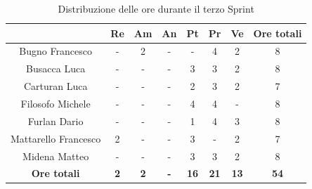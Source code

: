 \begin{table}[H]
  \centering
  \renewcommand{\arraystretch}{1.8}
  \begin{tabular}{c|c|c|c|c|c|c|c}
    \rowcolor[HTML]{125E28}
    \multicolumn{1}{c}{\color[HTML]{FFFFFF}\textbf{ Nominativo }}
                         & \multicolumn{1}{c}{\color[HTML]{FFFFFF}\textbf{ Re }}
                         & \multicolumn{1}{c}{\color[HTML]{FFFFFF}\textbf{ Am}}
                         & \multicolumn{1}{c}{\color[HTML]{FFFFFF}\textbf{ An }}
                         & \multicolumn{1}{c}{\color[HTML]{FFFFFF}\textbf{ Pt }}
                         & \multicolumn{1}{c}{\color[HTML]{FFFFFF}\textbf{ Pr }}
                         & \multicolumn{1}{c}{\color[HTML]{FFFFFF}\textbf{ Ve }}
                         & \multicolumn{1}{c}{\color[HTML]{FFFFFF}\textbf{ Ore totali }}                                                                                   \\
    \hline
    Bugno Francesco      & -                                                             & 2          & -          & -           & 4           & 2           & 8           \\
    Busacca Luca         & -                                                             & -          & -          & 3           & 3           & 2           & 8           \\
    Carturan Luca        & -                                                             & -          & -          & 2           & 3           & 2           & 7           \\
    Filosofo Michele     & -                                                             & -          & -          & 4           & 4           & -           & 8           \\
    Furlan Dario         & -                                                             & -          & -          & 1           & 4           & 3           & 8           \\
    Mattarello Francesco & 2                                                             & -          & -          & 3           & -           & 2           & 7           \\
    Midena Matteo        & -                                                             & -          & -          & 3           & 3           & 2           & 8           \\
    \textbf{Ore totali}  & \textbf{2}                                                    & \textbf{2} & \textbf{-} & \textbf{16} & \textbf{21} & \textbf{13} & \textbf{54}
  \end{tabular}
  \caption{Distribuzione delle ore durante il terzo Sprint}
\end{table}

